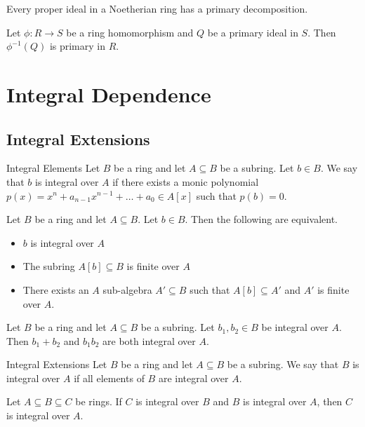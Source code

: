\documentclass[a4paper]{article}
\begin{document}
\begin{thm}{}{} Every proper ideal in a Noetherian ring has a primary decomposition. 
\end{thm}

\begin{lmm}{}{} Let $\phi:R\to S$ be a ring homomorphism and $Q$ be a primary ideal in $S$. Then $\phi^{-1}(Q)$ is primary in $R$. 
\end{lmm}

\pagebreak
\section{Integral Dependence}
\subsection{Integral Extensions}
\begin{defn}{Integral Elements}{} Let $B$ be a ring and let $A\subseteq B$ be a subring. Let $b\in B$. We say that $b$ is integral over $A$ if there exists a monic polynomial $p(x)=x^n+a_{n-1}x^{n-1}+\dots+a_0\in A[x]$ such that $p(b)=0$. 
\end{defn}

\begin{prp}{}{} Let $B$ be a ring and let $A\subseteq B$. Let $b\in B$. Then the following are equivalent. 
\begin{itemize}
\item $b$ is integral over $A$
\item The subring $A[b]\subseteq B$ is finite over $A$
\item There exists an $A$ sub-algebra $A'\subseteq B$ such that $A[b]\subseteq A'$ and $A'$ is finite over $A$. 
\end{itemize}
\end{prp}

\begin{prp}{}{} Let $B$ be a ring and let $A\subseteq B$ be a subring. Let $b_1,b_2\in B$ be integral over $A$. Then $b_1+b_2$ and $b_1b_2$ are both integral over $A$. 
\end{prp}

\begin{defn}{Integral Extensions}{} Let $B$ be a ring and let $A\subseteq B$ be a subring. We say that $B$ is integral over $A$ if all elements of $B$ are integral over $A$. 
\end{defn}

\begin{lmm}{}{} Let $A\subseteq B\subseteq C$ be rings. If $C$ is integral over $B$ and $B$ is integral over $A$, then $C$ is integral over $A$. 
\end{lmm}
\end{document}
